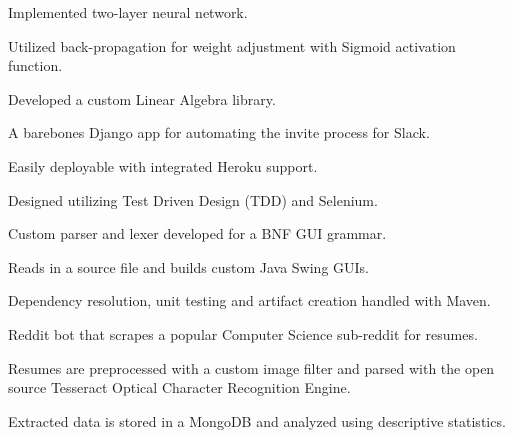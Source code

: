 \documentclass[]{sanchagrins-resume}
\begin{document}
\begin{minipage}[t]{0.63\textwidth}
\begin{tightemize}
\item Implemented two-layer neural network.
\item Utilized back-propagation for weight adjustment with Sigmoid activation function.
\item Developed a custom Linear Algebra library.
\end{tightemize}
\sectionsep

\begin{tightemize}
\item A barebones Django app for automating the invite process for Slack.
\item Easily deployable with integrated Heroku support.
\item Designed utilizing Test Driven Design (TDD) and Selenium.
\end{tightemize}
\sectionsep

\begin{tightemize}
\item Custom parser and lexer developed for a BNF GUI grammar.
\item Reads in a source file and builds custom Java Swing GUIs.
\item Dependency resolution, unit testing and artifact creation handled with Maven.
\end{tightemize}
\sectionsep


\begin{tightemize}
\item Reddit bot that scrapes a popular Computer Science sub-reddit for resumes.
\item Resumes are preprocessed with a custom image filter and parsed with the open source Tesseract Optical Character Recognition Engine.
\item Extracted data is stored in a MongoDB and analyzed using descriptive statistics.
\end{tightemize}
\sectionsep


\end{minipage} 
\end{document}
